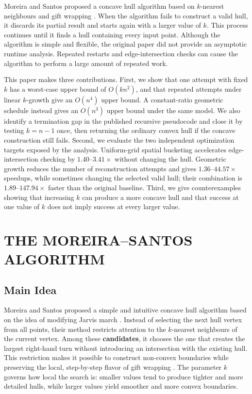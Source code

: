 \documentclass[a4paper,twoside]{article}
\begin{document}
Moreira and Santos proposed a concave hull algorithm based on $k$-nearest neighbours and gift wrapping \cite{moreira2007}. When the algorithm fails to construct a valid hull, it discards its partial result and starts again with a larger value of $k$. This process continues until it finds a hull containing every input point. Although the algorithm is simple and flexible, the original paper did not provide an asymptotic runtime analysis. Repeated restarts and edge-intersection checks can cause the algorithm to perform a large amount of repeated work.

This paper makes three contributions. First, we show that one attempt with fixed $k$ has a worst-case upper bound of $O(kn^2)$, and that repeated attempts under linear $k$-growth give an $O(n^4)$ upper bound. A constant-ratio geometric schedule instead gives an $O(n^3)$ upper bound under the same model. We also identify a termination gap in the published recursive pseudocode and close it by testing $k=n-1$ once, then returning the ordinary convex hull if the concave construction still fails. Second, we evaluate the two independent optimization targets exposed by the analysis. Uniform-grid spatial bucketing accelerates edge-intersection checking by $1.40$--$3.41\times$ without changing the hull. Geometric growth reduces the number of reconstruction attempts and gives $1.36$--$44.57\times$ speedups, while sometimes changing the selected valid hull; their combination is $1.89$--$147.94\times$ faster than the original baseline. Third, we give counterexamples showing that increasing $k$ can produce a more concave hull and that success at one value of $k$ does not imply success at every larger value.

\section{\uppercase{The Moreira--Santos Algorithm}}
\subsection{Main Idea}
Moreira and Santos \cite{moreira2007} proposed a simple and intuitive concave hull algorithm based on the idea of modifying Jarvis march \cite{jarvis1973}. Instead of selecting the next hull vertex from all points, their method restricts attention to the $k$-nearest neighbours of the current vertex. Among these \textbf{candidates}, it chooses the one that creates the largest right-hand turn without introducing an intersection with the existing hull.
This restriction makes it possible to construct non-convex boundaries while preserving the local, step-by-step flavor of gift wrapping \cite{jarvis1973}. The parameter $k$ governs how local the search is: smaller values tend to produce tighter and more detailed hulls, while larger values yield smoother and more convex boundaries.
\end{document}
